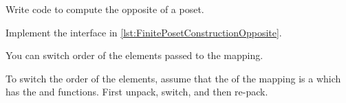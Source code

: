 
\begin{codeexercise}
    Write code to compute the opposite of a poset.

    Implement the interface in \cref{lst:FinitePosetConstructionOpposite}.
\end{codeexercise}


\begin{hint}
    You can switch order of the elements passed to the  mapping.

    To switch the order of the elements, assume that the  of the mapping is a  which has the  and  functions.
    First unpack, switch, and then re-pack.
\end{hint}
